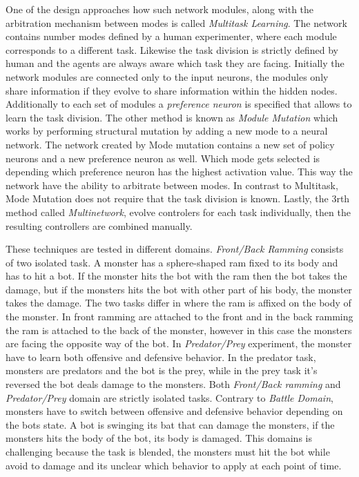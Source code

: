 \documentclass[format=acmsmall, review=false, screen=true]{acmart}
\begin{document}
One of the design approaches how such network modules, along with the arbitration mechanism between modes is called \emph{Multitask Learning}. The network contains number modes defined by a human experimenter, where each module corresponds to a different task. Likewise the task division is strictly defined by human and the agents are always aware which task they are facing. Initially the network modules are connected only to the input neurons, the modules only share information if they evolve to share information within the hidden nodes. Additionally to each set of modules a \emph{preference neuron} is specified that allows to learn the task division. The other method is known as \emph{Module Mutation} which works by performing structural mutation by adding a new mode to a neural network. The network created by Mode mutation contains a new set of policy neurons and a new preference neuron as well. Which mode gets selected is depending which preference neuron has the highest activation value. This way the network have the ability to arbitrate between modes. In contrast to Multitask, Mode Mutation does not require that the task division is known. Lastly, the 3rth method called \emph{Multinetwork}, evolve controlers for each task individually, then the resulting controllers are combined manually.

These techniques are tested in different domains. \emph{Front/Back Ramming} consists of two isolated task. A monster has a sphere-shaped ram fixed to its body and has to hit a bot. If the monster hits the bot with the ram then the bot takes the damage, but if the monsters hits the bot with other part of his body, the monster takes the damage. The two tasks differ in where the ram is affixed on the body of the monster. In front ramming are attached to the front and in the back ramming the ram is attached to the back of the monster, however in this case the monsters are facing the opposite way of the bot. In \emph{Predator/Prey} experiment, the monster have to learn both offensive and defensive behavior. In the predator task, monsters are predators and the bot is the prey, while in the prey task it's reversed the bot deals damage to the monsters. Both \emph{Front/Back ramming} and \emph{Predator/Prey} domain are strictly isolated tasks. Contrary to \emph{Battle Domain}, monsters have to switch between offensive and defensive behavior depending on the bots state. A bot is swinging its bat that can damage the monsters, if the monsters hits the body of the bot, its body is damaged. This domains is challenging because the task is blended, the monsters must hit the bot while avoid to damage and its unclear which behavior to apply at each point of time.
\end{document}
